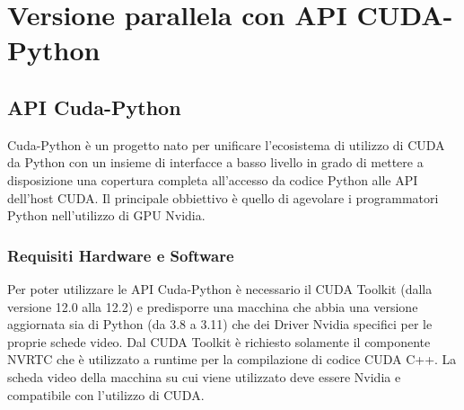 \documentclass[12pt,a4paper]{report}
\begin{document}
\chapter{Versione parallela con API CUDA-Python} 

\section{API Cuda-Python}
Cuda-Python è un progetto nato per unificare l'ecosistema di utilizzo di CUDA da Python con un insieme di interfacce a basso livello in grado di mettere a disposizione una copertura completa all'accesso da codice Python alle API dell'host CUDA. Il principale obbiettivo è quello di agevolare i programmatori Python nell'utilizzo di GPU Nvidia.

\subsection{Requisiti Hardware e Software}
Per poter utilizzare le API Cuda-Python è necessario il CUDA Toolkit (dalla versione 12.0 alla 12.2) e predisporre una macchina che abbia una versione aggiornata sia di Python (da 3.8 a 3.11) che dei Driver Nvidia specifici per le proprie schede video. \newline
Dal CUDA Toolkit è richiesto solamente il componente NVRTC che è utilizzato a runtime per la compilazione di codice CUDA C++. \newline
La scheda video della macchina su cui viene utilizzato deve essere Nvidia e compatibile con l'utilizzo di CUDA.
\end{document}
